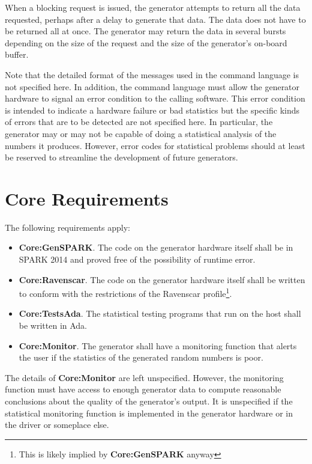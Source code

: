 When a blocking request is issued, the generator attempts to return all the data requested,
perhaps after a delay to generate that data. The data does not have to be returned all at once.
The generator may return the data in several bursts depending on the size of the request and the
size of the generator's on-board buffer.

Note that the detailed format of the messages used in the command language is not specified
here. In addition, the command language must allow the generator hardware to signal an error
condition to the calling software. This error condition is intended to indicate a hardware
failure or bad statistics but the specific kinds of errors that are to be detected are not
specified here. In particular, the generator may or may not be capable of doing a statistical
analysis of the numbers it produces. However, error codes for statistical problems should at
least be reserved to streamline the development of future generators.

\section{Core Requirements}
\label{sec:core-requirements}

The following requirements apply:

\begin{itemize}
\item \textbf{Core:GenSPARK}. The code on the generator hardware itself shall be in SPARK 2014
  and proved free of the possibility of runtime error.
\item \textbf{Core:Ravenscar}. The code on the generator hardware itself shall be written to
  conform with the restrictions of the Ravenscar profile\footnote{This is likely implied by
    \textbf{Core:GenSPARK} anyway}.
\item \textbf{Core:TestsAda}. The statistical testing programs that run on the host shall be
  written in Ada.
\item \textbf{Core:Monitor}. The generator shall have a monitoring function that alerts the user
  if the statistics of the generated random numbers is poor.
\end{itemize}

The details of \textbf{Core:Monitor} are left unspecified. However, the monitoring function must
have access to enough generator data to compute reasonable conclusions about the quality of the
generator's output. It is unspecified if the statistical monitoring function is implemented in
the generator hardware or in the driver or someplace else.

